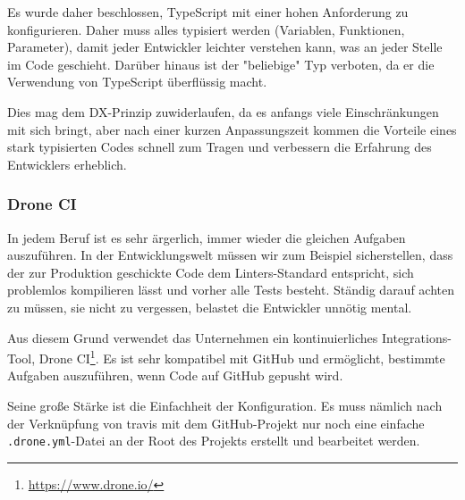 Es wurde daher beschlossen, TypeScript mit einer hohen Anforderung zu konfigurieren.
Daher muss alles typisiert werden (Variablen, Funktionen, Parameter), damit jeder Entwickler leichter verstehen kann, was an jeder Stelle im Code geschieht.
Darüber hinaus ist der "beliebige" Typ verboten, da er die Verwendung von TypeScript überflüssig macht.

Dies mag dem DX-Prinzip zuwiderlaufen, da es anfangs viele Einschränkungen mit sich bringt, aber nach einer kurzen Anpassungszeit kommen die Vorteile eines stark typisierten Codes schnell zum Tragen und verbessern die Erfahrung des Entwicklers erheblich.

\subsubsection{Drone CI}

In jedem Beruf ist es sehr ärgerlich, immer wieder die gleichen Aufgaben auszuführen.
In der Entwicklungswelt müssen wir zum Beispiel sicherstellen, dass der zur Produktion geschickte Code dem Linters-Standard entspricht, sich problemlos kompilieren lässt und vorher alle Tests besteht.
Ständig darauf achten zu müssen, sie nicht zu vergessen, belastet die Entwickler unnötig mental.

Aus diesem Grund verwendet das Unternehmen ein kontinuierliches Integrations-Tool, Drone CI\footnote{\href{https://www.drone.io/}{https://www.drone.io/}}.
Es ist sehr kompatibel mit GitHub und ermöglicht, bestimmte Aufgaben auszuführen, wenn Code auf GitHub gepusht wird.

Seine große Stärke ist die Einfachheit der Konfiguration. Es muss nämlich nach der Verknüpfung von travis mit dem GitHub-Projekt nur noch eine einfache \lstinline!.drone.yml!-Datei an
der Root des Projekts erstellt und bearbeitet werden.
